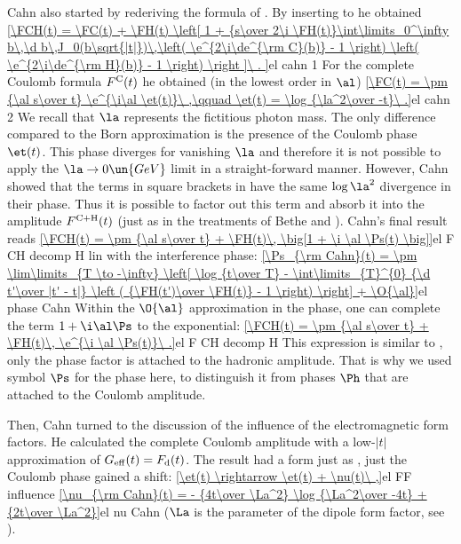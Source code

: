 Cahn  also started by rederiving the formula of \WY. By inserting  to  he obtained
\eqref{\FCH(t) = \FC(t)
+ \FH(t) \left[ 1 +
{s\over 2\i \FH(t)}\int\limits_0^\infty b\,\d b\,J_0(b\sqrt{|t|})\,\left( \e^{2\i\de^{\rm C}(b)} - 1 \right) \left( \e^{2\i\de^{\rm H}(b)} - 1 \right)
\right ]\ .
}{el cahn 1}
For the complete Coulomb formula $F^{\rm C}(t)$ he obtained (in the lowest order in $\al$)
\eqref{\FC(t) = \pm {\al s\over t} \e^{\i\al \et(t)}\ ,\qquad \et(t) = \log {\la^2\over -t}\ .}{el cahn 2}
We recall that $\la$ represents the fictitious photon mass. The only difference compared to the Born approximation  is the presence of the Coulomb phase $\et(t)$. This phase diverges for vanishing $\la$ and therefore it is not possible to apply the $\la\to 0\un{GeV}$ limit in a straight-forward manner. However, Cahn showed that the terms in square brackets in  have the same $\log\la^2$ divergence in their phase. Thus it is possible to factor out this term and absorb it into the amplitude $F^{\rm C+H}(t)$ (just as in the treatments of Bethe and \WY). Cahn's final result reads
\eqref{\FCH(t) = \pm {\al s\over t} + \FH(t)\, \big[1 + \i \al \Ps(t) \big]}{el F CH decomp H lin}
with the interference phase:
\eqref{\Ps_{\rm Cahn}(t) = \pm \lim\limits_{T \to -\infty} \left[ \log {t\over T} - \int\limits_{T}^{0} {\d t'\over |t' - t|} \left ( {\FH(t')\over \FH(t)} - 1 \right) \right] + \O{\al}}{el phase Cahn}
Within the $\O{\al}$ approximation in the phase, one can complete the term $1+\i\al\Ps$ to the exponential:
\eqref{\FCH(t) = \pm {\al s\over t} + \FH(t)\, \e^{\i \al \Ps(t)}\ .}{el F CH decomp H}
This expression is similar to , only the phase factor is attached to the hadronic amplitude. That is why we used symbol $\Ps$ for the phase here, to distinguish it from phases $\Ph$ that are attached to the Coulomb amplitude.

Then, Cahn turned to the discussion of the influence of the electromagnetic form factors. He calculated the complete Coulomb amplitude with a low-$|t|$ approximation of $G_{\rm eff}(t) = F_{\rm d}(t)$. The result had a form just as , just the Coulomb phase gained a shift:
\eqref{\et(t) \rightarrow \et(t) + \nu(t)\ ,}{el FF influence}
\eqref{\nu_{\rm Cahn}(t) = - {4t\over \La^2} \log {\La^2\over -4t} + {2t\over \La^2}}{el nu Cahn}
($\La$ is the parameter of the dipole form factor, see ).

